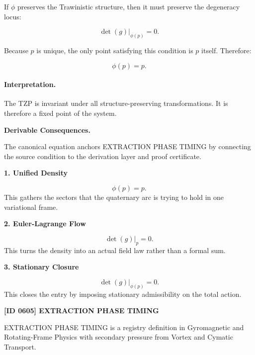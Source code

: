 If $\phi$ preserves the Trawinistic structure, then it must preserve the degeneracy locus:

\begin{equation}
\det(g)\big|_{\phi(p)}=0 .
\end{equation}

Because $p$ is unique, the only point satisfying this condition is $p$ itself. Therefore:

\begin{equation}
\phi(p)=p .
\end{equation}

\paragraph{Interpretation.}
The TZP is invariant under all structure-preserving transformations. It is therefore a fixed point of the system.

\par\vspace{0.35em}
\noindent\textbf{Derivable Consequences.}\quad
\begingroup
\footnotesize
\raggedright
The canonical equation anchors EXTRACTION PHASE TIMING by connecting the source condition to the derivation layer and proof certificate.
\par\endgroup

\noindent\textbf{1. Unified Density}\par
\[
\phi(p)=p.
\]
\noindent This gathers the sectors that the quaternary arc is trying to hold in one variational frame.\par
\noindent\textbf{2. Euler-Lagrange Flow}\par
\[
\det(g)\big|_p=0.
\]
\noindent This turns the density into an actual field law rather than a formal sum.\par
\noindent\textbf{3. Stationary Closure}\par
\[
\det(g)\big|_{\phi(p)}=0.
\]
\noindent This closes the entry by imposing stationary admissibility on the total action.\par

\clearpage
\noindent\textbf{[ID 0605] EXTRACTION PHASE TIMING}\par
\vspace{0.35em}
\begingroup\small
{}
EXTRACTION PHASE TIMING is a registry definition in Gyromagnetic and Rotating-Frame Physics with secondary pressure from Vortex and Cymatic Transport.

